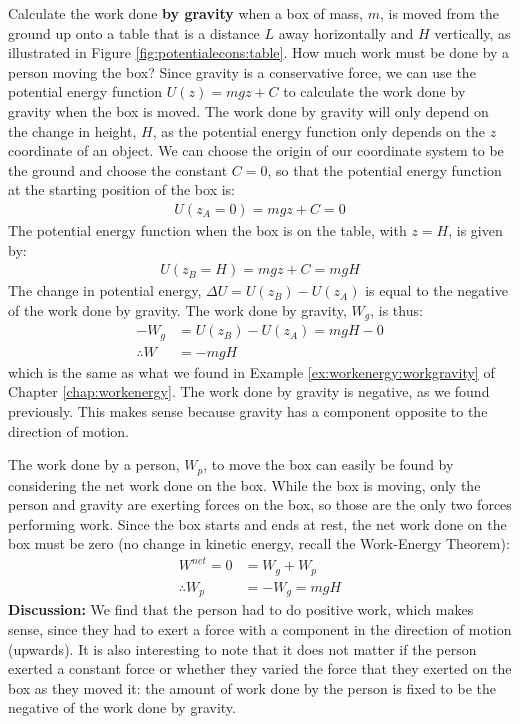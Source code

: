 \begin{example}{Calculate the work done \textbf{by gravity} when a box of mass, $m$, is moved from the ground up onto a table that is a distance $L$ away horizontally and $H$ vertically, as illustrated in Figure \ref{fig:potentialecons:table}. How much work must be done by a person moving the box?
}
Since gravity is a conservative force, we can use the potential energy function $U(z)=mgz+C$ to calculate the work done by gravity when the box is moved. The work done by gravity will only depend on the change in height, $H$, as the potential energy function only depends on the $z$ coordinate of an object.  We can choose the origin of our coordinate system to be the ground and choose the constant $C=0$, so that the potential energy function at the starting position of the box is:
\begin{align*}
U(z_A=0) = mgz+C= 0
\end{align*}
The potential energy function when the box is on the table, with $z=H$, is given by:
\begin{align*}
U(z_B=H) = mgz + C = mgH
\end{align*}
The change in potential energy, $\Delta U = U(z_B) - U(z_A)$ is equal to the negative of the work done by gravity. The work done by gravity, $W_g$, is thus:
\begin{align*}
-W_g &=  U(z_B) - U(z_A) = mgH - 0\\
\therefore W &= -mgH
\end{align*}
which is the same as what we found in Example \ref{ex:workenergy:workgravity} of Chapter \ref{chap:workenergy}. The work done by gravity is negative, as we found previously. This makes sense because gravity has a component opposite to the direction of motion.  

The work done by a person, $W_p$, to move the box can easily be found by considering the net work done on the box. While the box is moving, only the person and gravity are exerting forces on the box, so those are the only two forces performing work. Since the box starts and ends at rest, the net work done on the box must be zero (no change in kinetic energy, recall the Work-Energy Theorem):
\begin{align*}
W^{net} = 0 &= W_g + W_p\\
\therefore W_p &= -W_g = mgH
\end{align*}
\textbf{Discussion:} We find that the person had to do positive work, which makes sense, since they had to exert a force with a component in the direction of motion (upwards). It is also interesting to note that it does not matter if the person exerted a constant force or whether they varied the force that they exerted on the box as they moved it: the amount of work done by the person is fixed to be the negative of the work done by gravity.
\end{example}

